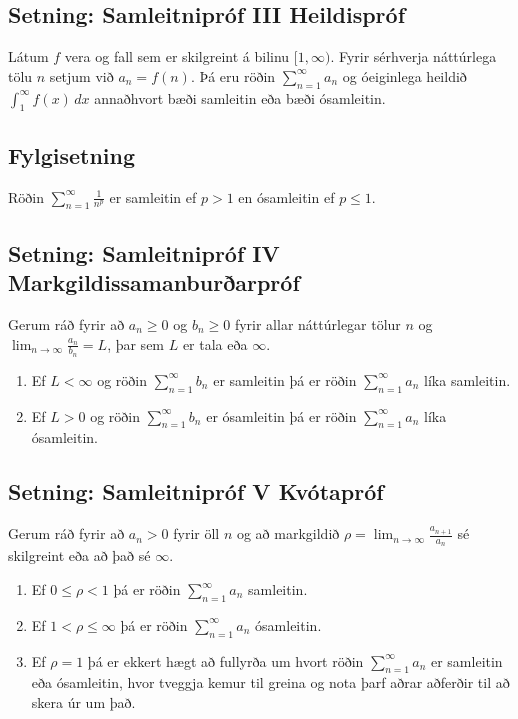 \documentclass[b5paper,10pt,icelandic]{sphinxmanual}
\begin{document}
\subsection{Setning: Samleitnipróf III \textendash{} Heildispróf}
\label{\detokenize{kafli09:setning-samleitniprof-iii-heildisprof}}
Látum \(f\) vera  og  fall sem er
skilgreint á bilinu \([1, \infty)\). Fyrir sérhverja náttúrlega tölu
\(n\) setjum við \(a_n=f(n)\). Þá eru röðin
\(\sum_{n=1}^\infty a_n\) og óeiginlega heildið
\(\int_1^\infty f(x)\,dx\) annaðhvort bæði samleitin eða bæði
ósamleitin.


\subsection{Fylgisetning}
\label{\detokenize{kafli09:id10}}
Röðin \(\sum_{n=1}^\infty\frac{1}{n^{p}}\) er samleitin ef
\(p>1\) en ósamleitin ef \(p\leq 1\).


\subsection{Setning: Samleitnipróf IV \textendash{} Markgildissamanburðarpróf}
\label{\detokenize{kafli09:setning-samleitniprof-iv-markgildissamanburarprof}}
Gerum ráð fyrir að \(a_n\geq 0\) og \(b_n\geq 0\) fyrir allar
náttúrlegar tölur \(n\) og
\(\lim_{n\rightarrow\infty}\frac{a_n}{b_n}=L\), þar sem \(L\) er
tala eða \(\infty\).
\begin{enumerate}
\item {} 
Ef \(L<\infty\) og röðin \(\sum_{n=1}^\infty b_n\) er
samleitin þá er röðin \(\sum_{n=1}^\infty a_n\) líka samleitin.

\item {} 
Ef \(L>0\) og röðin \(\sum_{n=1}^\infty b_n\) er ósamleitin
þá er röðin \(\sum_{n=1}^\infty a_n\) líka ósamleitin.

\end{enumerate}


\subsection{Setning: Samleitnipróf V \textendash{} Kvótapróf}
\label{\detokenize{kafli09:setning-samleitniprof-v-kvotaprof}}
Gerum ráð fyrir að \(a_n>0\) fyrir öll \(n\) og að markgildið
\(\rho=\lim_{n\rightarrow\infty}\frac{a_{n+1}}{a_n}\) sé skilgreint
eða að það sé \(\infty\).
\begin{enumerate}
\item {} 
Ef \(0\leq\rho<1\) þá er röðin \(\sum_{n=1}^\infty a_n\)
samleitin.

\item {} 
Ef \(1<\rho\leq \infty\) þá er röðin
\(\sum_{n=1}^\infty a_n\) ósamleitin.

\item {} 
Ef \(\rho=1\) þá er ekkert hægt að fullyrða um hvort röðin
\(\sum_{n=1}^\infty a_n\) er samleitin eða ósamleitin, hvor
tveggja kemur til greina og nota þarf aðrar aðferðir til að skera
úr um það.

\end{enumerate}
\end{document}
